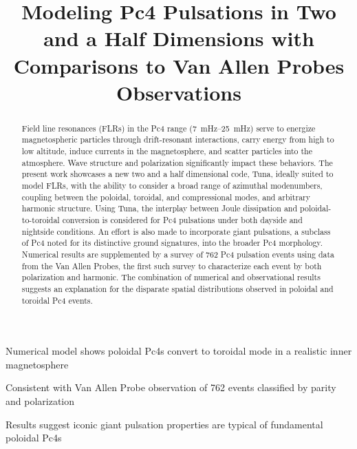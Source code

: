 \documentclass[draft,linenumbers]{agujournal}
\begin{document}

\title{Modeling Pc4 Pulsations in Two and a Half Dimensions with Comparisons to Van Allen Probes Observations}




\begin{keypoints}
\item Numerical model shows poloidal Pc4s convert to toroidal mode in a realistic inner magnetosphere
\item Consistent with Van Allen Probe observation of 762 events classified by parity and polarization
\item Results suggest iconic giant pulsation properties are typical of fundamental poloidal Pc4s
\end{keypoints}


\begin{abstract}
Field line resonances (FLRs) in the Pc4 range (\SIrange{7}{25}{\mHz}) serve to energize magnetospheric particles through drift-resonant interactions, carry energy from high to low altitude, induce currents in the magnetosphere, and scatter particles into the atmosphere. Wave structure and polarization significantly impact these behaviors. The present work showcases a new two and a half dimensional code, Tuna, ideally suited to model FLRs, with the ability to consider a broad range of azimuthal modenumbers, coupling between the poloidal, toroidal, and compressional modes, and arbitrary harmonic structure. Using Tuna, the interplay between Joule dissipation and poloidal-to-toroidal conversion is considered for Pc4 pulsations under both dayside and nightside conditions. An effort is also made to incorporate giant pulsations, a subclass of Pc4 noted for its distinctive ground signatures, into the broader Pc4 morphology. Numerical results are supplemented by a survey of 762 Pc4 pulsation events using data from the Van Allen Probes, the first such survey to characterize each event by both polarization and harmonic. The combination of numerical and observational results suggests an explanation for the disparate spatial distributions observed in poloidal and toroidal Pc4 events.
\end{abstract}
\end{document}
